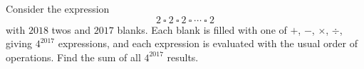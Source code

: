 Consider the expression
\[
2\ \square\ 2\ \square\ 2\ \square\ \cdots\ \square\ 2
\]
with $2018$ twos and $2017$ blanks. Each blank is filled with one of $+$, $-$, $\times$, $\div$, giving $4^{2017}$ expressions, and each expression is evaluated with the usual order of operations. Find the sum of all $4^{2017}$ results.
